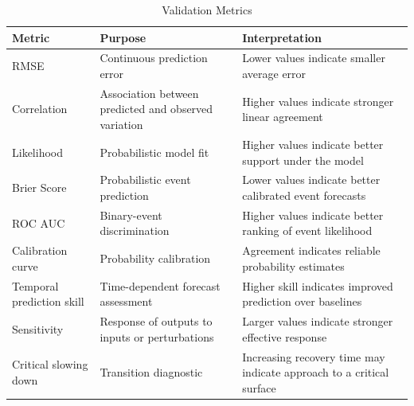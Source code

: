\begin{table}
\centering
\caption{Validation Metrics}
\label{tab:validation_metrics}
\begin{tabular}{p{}p{}p{}}
\hline
Metric & Purpose & Interpretation \\
\hline
RMSE & Continuous prediction error & Lower values indicate smaller average error \\
Correlation & Association between predicted and observed variation & Higher values indicate stronger linear agreement \\
Likelihood & Probabilistic model fit & Higher values indicate better support under the model \\
Brier Score & Probabilistic event prediction & Lower values indicate better calibrated event forecasts \\
ROC AUC & Binary-event discrimination & Higher values indicate better ranking of event likelihood \\
Calibration curve & Probability calibration & Agreement indicates reliable probability estimates \\
Temporal prediction skill & Time-dependent forecast assessment & Higher skill indicates improved prediction over baselines \\
Sensitivity & Response of outputs to inputs or perturbations & Larger values indicate stronger effective response \\
Critical slowing down & Transition diagnostic & Increasing recovery time may indicate approach to a critical surface \\
\hline
\end{tabular}
\end{table}

